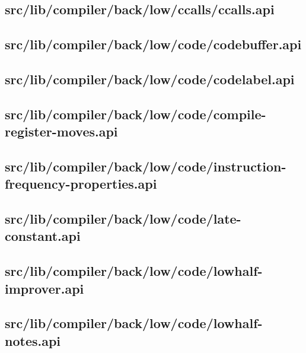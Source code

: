 \subsection{src/lib/compiler/back/low/ccalls/ccalls.api}


\subsection{src/lib/compiler/back/low/code/codebuffer.api}


\subsection{src/lib/compiler/back/low/code/codelabel.api}


\subsection{src/lib/compiler/back/low/code/compile-register-moves.api}


\subsection{src/lib/compiler/back/low/code/instruction-frequency-properties.api}


\subsection{src/lib/compiler/back/low/code/late-constant.api}


\subsection{src/lib/compiler/back/low/code/lowhalf-improver.api}


\subsection{src/lib/compiler/back/low/code/lowhalf-notes.api}


